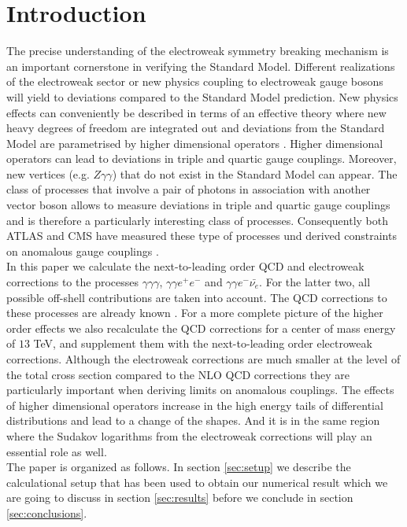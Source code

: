\section{Introduction}
\label{sec:intro}

The precise understanding of the electroweak symmetry breaking mechanism is an important cornerstone in verifying the
Standard Model. Different realizations of the electroweak sector or new physics coupling to electroweak gauge bosons will
yield to deviations compared to the Standard Model prediction. New physics effects can conveniently be described in terms
of an effective theory where new heavy degrees of freedom are integrated out and deviations from the Standard Model are 
parametrised by higher dimensional operators \cite{Weinberg:1978kz,Weinberg:1979pi}. Higher dimensional operators can lead
 to deviations in triple and quartic gauge couplings. Moreover, new vertices (e.g. $Z\gamma\gamma$) that do not exist in the 
Standard Model can appear. The class of processes that involve a pair of photons in association with another vector boson
allows to measure deviations in triple and quartic gauge couplings and is therefore a particularly interesting class of processes.
 Consequently both ATLAS and CMS have measured these type of processes und derived constraints on anomalous gauge
 couplings \cite{Aad:2016sau,Sirunyan:2017lvq,Aad:2015uqa,Aad:2015bua}.\\
 In this paper we calculate the next-to-leading order QCD and electroweak corrections to the processes 
 $\gamma\gamma\gamma$, $\gamma\gamma e^{+} e^{-}$ and $\gamma\gamma e^{-} \bar{\nu_e}$. For the latter two, all
 possible off-shell contributions are taken into account. The QCD corrections to these processes are already known 
 \cite{Bozzi:2011en,Campbell:2012ft,Bozzi:2011wwa}. For a more complete picture of the higher order effects we also
recalculate the QCD corrections for a center of mass energy of $13$ TeV, and supplement them with the 
 next-to-leading order electroweak corrections. Although the electroweak corrections are much smaller at the level
 of the total cross section compared to the NLO QCD corrections they are particularly important when deriving limits on 
 anomalous couplings. The effects of higher dimensional operators increase in the high energy tails of differential distributions
 and lead to a change of the shapes. And it is in the same region where the Sudakov logarithms from the electroweak
 corrections will play an essential role as well.\\
 The paper is organized as follows. In section \ref{sec:setup} we describe the calculational setup that has been used to obtain our
 numerical result which we are going to discuss in section \ref{sec:results} before we conclude in section \ref{sec:conclusions}.
 